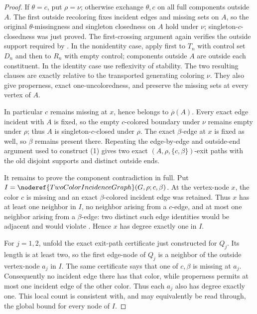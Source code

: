 \begin{proof}
If $\theta=c$, put $\rho=\nu$; otherwise exchange $\theta,c$ on all full
components outside $A$.  The first outside recoloring fixes incident
edges and missing sets on $A$, so the original $\theta$-missingness and
singleton closedness on $A$ hold under $\nu$; singleton-$c$-closedness was
just proved.  The first-crossing argument again verifies the outside
support required by .  In the nonidentity
case, apply  first to $T_n$ with
control set $D_n$ and then to $R_n$ with empty control; components outside
$A$ are outside each constituent.  In the identity case use reflexivity
of stability.  The two resulting clauses are exactly
 relative to the transported generating
coloring $\nu$.  They also give properness, exact one-uncoloredness, and
preserve the missing sets at every vertex of $A$.

In particular $c$ remains missing at $x$, hence belongs to
$\overline\rho(A)$.  Every exact edge incident with $A$ is fixed, so the
empty $c$-colored boundary under $\nu$ remains empty under $\rho$; thus
$A$ is singleton-$c$-closed under $\rho$.  The exact $\beta$-edge at $x$
is fixed as well, so $\beta$ remains present there.  Repeating the
edge-by-edge and outside-end argument used to construct (1) gives two
exact $(A,\rho,\{c,\beta\})$-exit paths with the old disjoint supports
and distinct outside ends.

It remains to prove the component contradiction in full.  Put
$I=\noderef{TwoColorIncidenceGraph}(G,\rho;c,\beta)$.  At the vertex-node
$x$, the color $c$ is missing and an exact $\beta$-colored incident edge
was retained.  Thus $x$ has at least one neighbor in $I$, no neighbor
arising from a $c$-edge, and at most one neighbor arising from a
$\beta$-edge: two distinct such edge identities would be adjacent and
would violate .  Hence $x$ has degree
exactly one in $I$.

For $j=1,2$, unfold the exact exit-path certificate just constructed for
$Q_j$.  Its length is at least two, so the first edge-node of $Q_j$ is a
neighbor of the outside vertex-node $a_j$ in $I$.  The same certificate
says that one of $c,\beta$ is missing at $a_j$.  Consequently no incident
edge there has that color, while properness permits at most one incident
edge of the other color.  Thus each $a_j$ also has degree exactly one.
This local count is consistent with, and may equivalently be read through,
the global bound  for every
node of $I$.


\end{proof}
